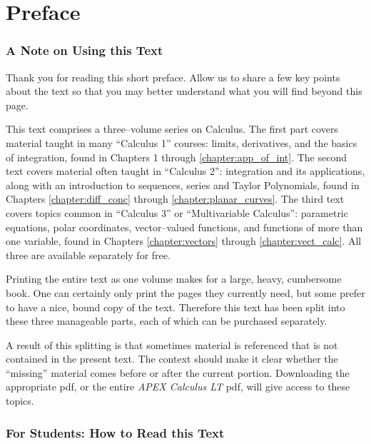 \prefacegeometry
\chapter*{Preface}
\thispagestyle{empty}

\subsection*{A Note on Using this Text}

Thank you for reading this short preface. Allow us to share a few key points about the text so that you may better understand what you will find beyond this page.

This text comprises a three--volume series on Calculus.
The first part covers material taught in many ``Calculus 1'' courses: limits, derivatives, and the basics of integration, found in Chapters 1 through \ref{chapter:app_of_int}. The second text covers material often taught in ``Calculus 2'': integration and its applications, along with an introduction to sequences, series and Taylor Polynomials, found in Chapters \ref{chapter:diff_conc} through \ref{chapter:planar_curves}. The third text covers topics common in ``Calculus 3'' or ``Multivariable Calculus'': parametric equations, polar coordinates, vector--valued functions, and functions of more than one variable, found in Chapters \ref{chapter:vectors} through \ref{chapter:vect_calc}. All three are available separately for free.

Printing the entire text as one volume makes for a large, heavy, cumbersome book. One can certainly only print the pages they currently need, but some prefer to have a nice, bound copy of the text. Therefore this text has been split into these three manageable parts, each of which can be purchased separately.%

A result of this splitting is that sometimes material is referenced that is not contained in the present text. The context should make it clear whether the ``missing'' material comes before or after the current portion. Downloading the appropriate pdf, or the entire \textit{APEX Calculus LT} pdf, will give access to these topics.

\subsection*{For Students: How to Read this Text}

